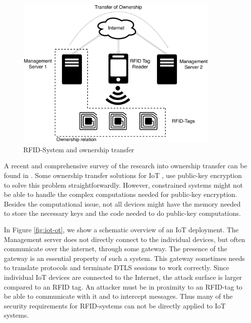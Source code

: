 \begin{figure}[h]
\centering
\includegraphics[width=0.9\textwidth]{images/RFID-Tag_OT.pdf}
\caption{RFID-System and ownership transfer}
\label{fig:rfid-ot}
\end{figure}



A recent and comprehensive survey of the research into ownership transfer can be found in \cite{taqieddin2018tag}.
Some ownership transfer solutions for IoT \cite{tam2004protocol}, use public-key encryption to solve this problem straightforwardly. However, constrained systems might not be able to handle the complex computations needed for public-key encryption. Besides the computational issue, not all devices might have the memory needed to store the necessary keys and the code needed to do public-key computations.

In Figure \ref{fig:iot-ot}, we show a schematic overview of an IoT deployment. The Management server does not directly connect to the individual devices, but often communicate over the internet, through some gateway. The presence of the gateway is an essential property of such a system. This gateway sometimes needs to translate protocols and terminate DTLS sessions to work correctly. Since individual IoT devices are connected to the Internet, the attack surface is larger compared to an RFID tag. An attacker must be in proximity to an RFID-tag to be able to communicate with it and to intercept messages. Thus many of the security requirements for RFID-systems can not be directly applied to IoT systems.



